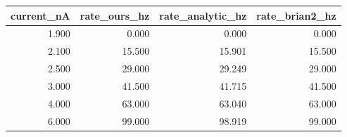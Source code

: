 \begin{tabular}{rrrr}
\toprule
current_nA & rate_ours_hz & rate_analytic_hz & rate_brian2_hz \\
\midrule
1.900 & 0.000 & 0.000 & 0.000 \\
2.100 & 15.500 & 15.901 & 15.500 \\
2.500 & 29.000 & 29.249 & 29.000 \\
3.000 & 41.500 & 41.715 & 41.500 \\
4.000 & 63.000 & 63.040 & 63.000 \\
6.000 & 99.000 & 98.919 & 99.000 \\
\bottomrule
\end{tabular}

